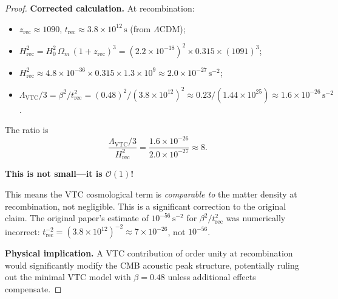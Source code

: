 \documentclass[11pt,a4paper]{article}
\theoremstyle{definition}
\newcommand{\VTC}{\mathrm{VTC}}
\newcommand{\rec}{\mathrm{rec}}
\begin{document}
\begin{proof}
\textbf{Corrected calculation.} At recombination:
\begin{itemize}
    \item $z_{\rec} \approx 1090$, $t_{\rec} \approx 3.8\times 10^{12}\,\mathrm{s}$ (from $\Lambda$CDM);
    \item $H_{\rec}^2 = H_0^2\,\Omega_m\,(1+z_{\rec})^3 = (2.2\times 10^{-18})^2\times 0.315\times(1091)^3$;
    \item $H_{\rec}^2 \approx 4.8\times 10^{-36}\times 0.315\times 1.3\times 10^9 \approx 2.0\times 10^{-27}\,\mathrm{s}^{-2}$;
    \item $\Lambda_{\VTC}/3 = \beta^2/t_{\rec}^2 = (0.48)^2/(3.8\times 10^{12})^2 \approx 0.23/(1.44\times 10^{25}) \approx 1.6\times 10^{-26}\,\mathrm{s}^{-2}$.
\end{itemize}
The ratio is
\begin{equation}
\frac{\Lambda_{\VTC}/3}{H_{\rec}^2} = \frac{1.6\times 10^{-26}}{2.0\times 10^{-27}} \approx 8.
\end{equation}

\textbf{This is not small---it is $\mathcal{O}(1)$!}

This means the VTC cosmological term is \textit{comparable to} the matter density at recombination, not negligible. This is a significant correction to the original claim. The original paper's estimate of $10^{-56}\,\mathrm{s}^{-2}$ for $\beta^2/t_{\rec}^2$ was numerically incorrect: $t_{\rec}^{-2} = (3.8\times 10^{12})^{-2} \approx 7\times 10^{-26}$, not $10^{-56}$.

\textbf{Physical implication.} A VTC contribution of order unity at recombination would significantly modify the CMB acoustic peak structure, potentially ruling out the minimal VTC model with $\beta = 0.48$ unless additional effects compensate.


\end{proof}
\end{document}
